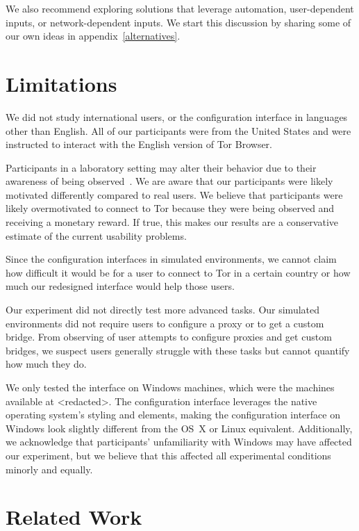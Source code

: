 \documentclass[USenglish,oneside,twocolumn]{article}
\begin{document}
We also recommend exploring solutions that leverage automation, user-dependent inputs, or network-dependent inputs. We start this discussion by sharing some of our own ideas in appendix~\ref{alternatives}. 

\section{Limitations}
\label{sec:limitations}
We did not study international users, or the configuration interface in languages other than English. All of our participants were from the United States and were instructed to interact with the English version of Tor Browser.

Participants in a laboratory setting may alter their behavior due to their awareness of being observed~\cite{mccarney2007hawthorne}. We are aware that our participants were likely motivated differently compared to real users. We believe that participants were likely overmotivated to connect to Tor because they were being observed and receiving a monetary reward. If true, this makes our results are a conservative estimate of the current usability problems. 

Since the configuration interfaces in simulated environments, we cannot claim how difficult it would be for a user to connect to Tor in a certain country or how much our redesigned interface would help those users.  

Our experiment did not directly test more advanced tasks. Our simulated environments did not require users to configure a proxy or to get a custom bridge. From observing of user attempts to configure proxies and get custom bridges, we suspect users generally struggle with these tasks but cannot quantify how much they do. 

We only tested the interface on Windows machines, which were the machines available at <redacted>. %
The configuration interface leverages the native operating system's styling and elements, making the configuration interface on Windows look slightly different from the OS~X or Linux equivalent. Additionally, we acknowledge that participants' unfamiliarity with Windows may have affected our experiment, but we believe that this affected all experimental conditions minorly and equally.  

\section{Related Work}
\label{sec:related} 
\end{document}
